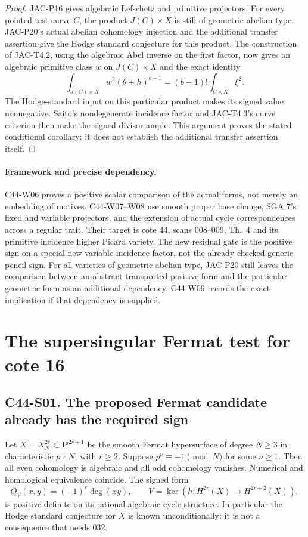 \begin{proof}
JAC-P16 gives algebraic Lefschetz and primitive projectors. For
every pointed test curve $C$, the product $J(C)\times X$ is still
of geometric abelian type. JAC-P20's actual abelian cohomology
injection and the additional transfer assertion give the Hodge
standard conjecture for this product. The construction of
JAC-T4.2, using the algebraic Abel inverse on the first factor,
now gives an algebraic primitive class $w$ on $J(C)\times X$ and
the exact identity
\[
 \int_{J(C)\times X}w^2(\theta+h)^{b-1}
       =(b-1)!\int_{C\times X}\xi^2.
\]
The Hodge-standard input on this particular product makes its
signed value nonnegative. Saito's nondegenerate incidence factor
and JAC-T4.3's curve criterion then make the signed divisor ample.
This argument proves the stated conditional corollary; it does
not establish the additional transfer assertion itself.
\end{proof}

\paragraph{Framework and precise dependency.}
C44-W06 proves a positive scalar comparison of the actual forms,
not merely an embedding of motives. C44-W07--W08 use smooth
proper base change, SGA 7's fixed and variable projectors, and
the extension of actual cycle correspondences across a regular
trait. Their target is cote 44, scans 008--009, Th.~4 and its
primitive incidence higher Picard variety. The new residual gate
is the positive sign on a special new variable incidence factor,
not the already checked generic pencil sign. For all varieties
of geometric abelian type, JAC-P20 still leaves the comparison
between an abstract transported positive form and the particular
geometric form as an additional dependency. C44-W09 records
the exact implication if that dependency is supplied.


\section{The supersingular Fermat test for cote 16}

\subsection*{C44-S01. The proposed Fermat candidate already has the required sign}

\begin{proposition}[C44-S01; unconditional]
Let $X=X_N^{2r}\subset\mathbf P^{2r+1}$ be the smooth Fermat
hypersurface of degree $N\geq3$ in characteristic $p\nmid N$,
with $r\geq2$.  Suppose $p^\nu\equiv-1\pmod N$ for some
$\nu\geq1$.  Then all even cohomology is algebraic and all odd
cohomology vanishes.  Numerical and homological equivalence
coincide.  The signed form
\[
 Q_V(x,y)=(-1)^r\deg(xy),\qquad
 V=\ker(h:H^{2r}(X)\longrightarrow H^{2r+2}(X)),
\]
is positive definite on its rational algebraic cycle structure.
In particular the Hodge standard conjecture for $X$ is known
unconditionally; it is not a consequence that needs 032.
\end{proposition}


